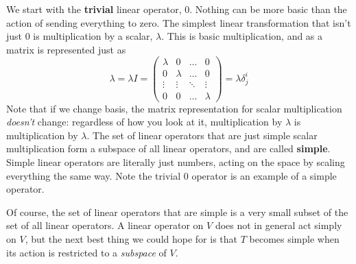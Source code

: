 \begin{appendices}
	We start with the \textbf{trivial} linear operator, $0$. Nothing can be more basic than the action of sending everything to zero. The simplest linear transformation that isn't just $0$ is multiplication by a scalar, $\lambda$. This is basic multiplication, and as a matrix is represented just as
	\begin{equation*}
		\lambda = \lambda I=
		\begin{pmatrix}
			\lambda & 0 & \dots & 0 \\
			0 & \lambda & \dots & 0 \\
			\vdots & \vdots & \ddots & \vdots \\
			0 & 0 & \dots & \lambda
		\end{pmatrix}  = \lambda \delta^i_j
	\end{equation*}
	Note that if we change basis, the matrix representation for scalar multiplication \emph{doesn't} change: regardless of how you look at it, multiplication by $\lambda$ is multiplication by $\lambda$. The set of linear operators that are just simple scalar multiplication form a subspace of all linear operators, and are called \textbf{simple}. Simple linear operators are literally just numbers, acting on the space by scaling everything the same way. Note the trivial $0$ operator is an example of a simple operator.
	
	Of course, the set of linear operators that are simple is a very small subset of the set of all linear operators. A linear operator on $V$ does not in general act simply on $V$, but the next best thing we could hope for is that $T$ becomes simple when its action is restricted to a \emph{subspace} of $V$. 
	
	
%
	

\end{appendices}
